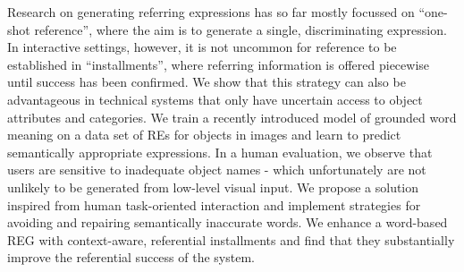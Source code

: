 Research on generating referring expressions has so far mostly focussed on ``one-shot reference'', where the aim is to generate a single, discriminating expression. In interactive settings, however, it is not uncommon for reference to be established in ``installments'', where referring information is offered piecewise until success has been confirmed. We show that this strategy can also be advantageous in technical systems that only have uncertain access to object attributes and categories. We train a recently introduced model of grounded word meaning on a data set of REs for objects in images and learn to predict semantically appropriate expressions. In a human evaluation, we observe that users are sensitive to inadequate object names - which unfortunately are not unlikely to be generated from low-level visual input. We propose a solution inspired from human task-oriented interaction and implement strategies for avoiding and repairing semantically inaccurate words. We enhance a word-based REG with context-aware, referential installments and find that they substantially improve the referential success of the system.
